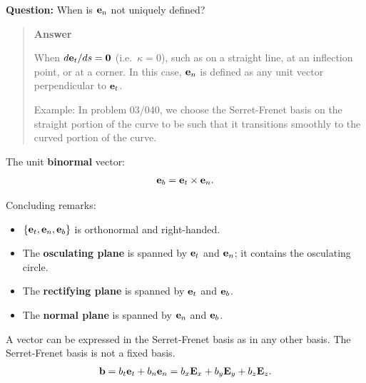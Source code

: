 \documentclass[
  letterpaper,
  DIV=11,
  numbers=noendperiod]{scrreprt}
\providecommand{\tightlist}{%
  \setlength{\itemsep}{0pt}\setlength{\parskip}{0pt}}
\begin{document}
\begin{tcolorbox}[enhanced jigsaw, arc=.35mm, bottomrule=.15mm, bottomtitle=1mm, breakable, colback=white, colbacktitle=quarto-callout-tip-color!10!white, colframe=quarto-callout-tip-color-frame, coltitle=black, left=2mm, leftrule=.75mm, opacityback=0, opacitybacktitle=0.6, rightrule=.15mm, title=\textcolor{quarto-callout-tip-color}{\faLightbulb}\hspace{0.5em}{Think!}, titlerule=0mm, toprule=.15mm, toptitle=1mm]

\textbf{Question:} When is \({\bf e}_n\) not uniquely defined?

\begin{quote}
\textbf{Answer}

When \(d{\bf e}_t/ds = {\bf 0}\) (i.e.~\(\kappa = 0\)), such as on a
straight line, at an inflection point, or at a corner. In this case,
\({\bf e}_n\) is defined as any unit vector perpendicular to
\({\bf e}_t\).

Example: In problem 03/040, we choose the Serret-Frenet basis on the
straight portion of the curve to be such that it transitions smoothly to
the curved portion of the curve.
\end{quote}

\end{tcolorbox}

The unit \textbf{binormal} vector: \begin{align*}
    {\bf e}_b = {\bf e}_t\times{\bf e}_n.
\end{align*}

Concluding remarks:

\begin{itemize}
\tightlist
\item
  \(\{{\bf e}_t,{\bf e}_n,{\bf e}_b\}\) is orthonormal and right-handed.
\item
  The \textbf{osculating plane} is spanned by \({\bf e}_t\) and
  \({\bf e}_n\); it contains the osculating circle.
\item
  The \textbf{rectifying plane} is spanned by \({\bf e}_t\) and
  \({\bf e}_b\).
\item
  The \textbf{normal plane} is spanned by \({\bf e}_n\) and
  \({\bf e}_b\).
\end{itemize}

A vector can be expressed in the Serret-Frenet basis as in any other
basis. The Serret-Frenet basis is not a fixed basis. \begin{align}
    {\bf b} = b_t{\bf e}_t+b_n{\bf e}_n = b_x{\bf E}_x+b_y{\bf E}_y+b_z{\bf E}_z.
\end{align}
\end{document}
